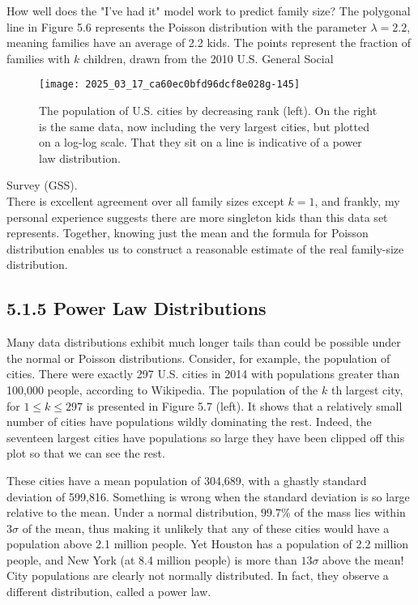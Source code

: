 \documentclass[10pt]{article}
\begin{document}
How well does the "I've had it" model work to predict family size? The polygonal line in Figure 5.6 represents the Poisson distribution with the parameter $\lambda=2.2$, meaning families have an average of 2.2 kids. The points represent the fraction of families with $k$ children, drawn from the 2010 U.S. General Social\\
\begin{figure}[h]
\centering
\texttt{[image: 2025\_03\_17\_ca60ec0bfd96dcf8e028g-145]}
\caption{The population of U.S. cities by decreasing rank (left). On the right is the same data, now including the very largest cities, but plotted on a log-log scale. That they sit on a line is indicative of a power law distribution.}
\end{figure}

Survey (GSS).\\
There is excellent agreement over all family sizes except $k=1$, and frankly, my personal experience suggests there are more singleton kids than this data set represents. Together, knowing just the mean and the formula for Poisson distribution enables us to construct a reasonable estimate of the real family-size distribution.

\subsection*{5.1.5 Power Law Distributions}
Many data distributions exhibit much longer tails than could be possible under the normal or Poisson distributions. Consider, for example, the population of cities. There were exactly 297 U.S. cities in 2014 with populations greater than 100,000 people, according to Wikipedia. The population of the $k$ th largest city, for $1 \leq k \leq 297$ is presented in Figure 5.7 (left). It shows that a relatively small number of cities have populations wildly dominating the rest. Indeed, the seventeen largest cities have populations so large they have been clipped off this plot so that we can see the rest.

These cities have a mean population of 304,689, with a ghastly standard deviation of 599,816. Something is wrong when the standard deviation is so large relative to the mean. Under a normal distribution, $99.7 \%$ of the mass lies within $3 \sigma$ of the mean, thus making it unlikely that any of these cities would have a population above 2.1 million people. Yet Houston has a population of 2.2 million people, and New York (at 8.4 million people) is more than $13 \sigma$ above the mean! City populations are clearly not normally distributed. In fact, they observe a different distribution, called a power law.
\end{document}

